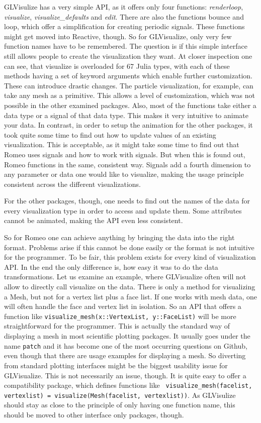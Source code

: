 {GLVisulize has a very simple API, as it offers only four functions: \textit{renderloop}, \textit{visualize}, \textit{visualize\_defaults} and \textit{edit}.
There are also the functions bounce and loop, which offer a simplification for creating periodic signals.
These functions might get moved into Reactive, though.
So for GLVisualize, only very few function names have to be remembered.
The question is if this simple interface still allows people to create the visualization they want.
At closer inspection one can see, that visualize is overloaded for 67 Julia types, with each of these methods having a set of keyword arguments which enable further customization.
These can introduce drastic changes. The particle visualization, for example, can take any mesh as a primitive. This allows a level of customization, which was not possible in the other examined packages.
Also, most of the functions take either a data type or a signal of that data type.
This makes it very intuitive to animate your data. 
In contrast, in order to setup the animation for the other packages, it took quite some time to find out how to update values of an existing visualization. This is acceptable, as it might take some time to find out that Romeo uses signals and how to work with signals.
But when this is found out, Romeo functions in the same, consistent way. 
Signals add a fourth dimension to any parameter or data one would like to visualize, making the usage principle consistent across the different visualizations.

For the other packages, though, one needs to find out the names of the data for every visualization type in order to access and update them. Some attributes cannot be animated, making the API even less consistent.

So for Romeo one can achieve anything by bringing the data into the right format.
Problems arise if this cannot be done easily or the format is not intuitive for the programmer.
To be fair, this problem exists for every kind of visualization API.
In the end the only difference is, how easy it was to do the data transformations. 
Let us examine an example, where GLVisualize often will not allow to directly call visualize on the data.
There is only a method for visualizing a Mesh, but not for a vertex list plus a face list. 
If one works with mesh data, one will often handle the face and vertex list in isolation.
So an API that offers a function like \texttt{visualize\_mesh(x::VertexList, y::FaceList)} will be more straightforward for the programmer.
This is actually the standard way of displaying a mesh in most scientific plotting packages. It usually goes under the name \texttt{patch} and it has become one of the most occurring questions on Github, even though that there are usage examples for displaying a mesh.
So diverting from standard plotting interfaces might be the biggest usability issue for GLVisualize.
This is not necessarily an issue, though. 
It is quite easy to offer a compatibility package, which defines functions like \texttt{
visualize\_mesh(facelist, vertexlist) = visualize(Mesh(facelist, vertexlist))}.
As GLVisulize should stay as close to the principle of only having one function name, this should be moved to other interface only packages, though.

}
